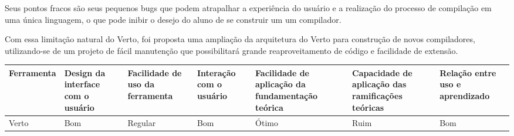 Seus pontos fracos são seus pequenos bugs que podem atrapalhar a experiência do usuário e
a realização do processo de compilação em uma única linguagem, o que pode inibir o 
desejo do aluno de se construir um um compilador.

Com essa limitação natural do Verto, foi proposta uma ampliação da
arquitetura do Verto para construção de novos compiladores, utilizando-se de
um projeto de fácil manutenção que possibilitará grande reaproveitamento de código e
facilidade de extensão.

\begin{tabular}{|m{1.6cm}|m{1.5cm}|m{1.5cm}|m{1.5cm}|m{1.5cm}|m{1.8cm}|m{1.5cm}|}  \hline
   Ferramenta & Design da interface com o usuário & Facilidade de uso da ferramenta & Interação com o usuário & Facilidade de aplicação da fundamentação teórica & Capacidade de aplicação das ramificações teóricas & Relação entre uso e aprendizado \\ \hline
Verto & Bom & Regular & Bom & Ótimo & Ruim & Bom \\ \hline
\end{tabular}




